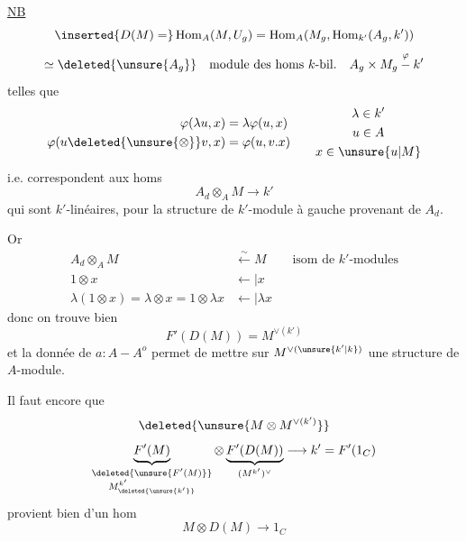\uline{NB}
\[
\inserted{D(M)=}
\operatorname{Hom}_A(M,U_g)
=\operatorname{Hom}_A(M_g,\operatorname{Hom}_{k'}(A_g,k'))
\]
\[
\simeq\deleted{\unsure{A_g}}\quad
\text{module des homs }k\text{-bil.}\quad
A_g\times M_g\overset{\varphi}{-}k'
\]
telles que
\[
\begin{aligned}
\varphi(\lambda u,x)&=\lambda\varphi(u,x)\\
\varphi(u\deleted{\unsure{\otimes}}v,x)&=\varphi(u,v.x)
\end{aligned}
\qquad
\begin{gathered}
\lambda\in k'\\u\in A\\x\in\unsure{u|M}
\end{gathered}
\]
i.e. correspondent aux homs
\[
A_d\otimes_A M\longrightarrow k'
\]
qui sont $k'$-linéaires, pour la structure de $k'$-module à gauche
provenant de $A_d$.

Or
\[
\begin{aligned}
A_d\otimes_A M&\xleftarrow{\sim}M
&&\text{isom de }k'\text{-modules}\\
1\otimes x&\mathrel{\longleftarrow\!\vert} x\\
\lambda(1\otimes x)=\lambda\otimes x=1\otimes\lambda x
&\mathrel{\longleftarrow\!\vert}\lambda x
\end{aligned}
\]
donc on trouve bien 
\[
F'(D(M))=M^{\vee(k')}
\]
et la donnée de $a:A-A^o$ permet de mettre sur
$M^{\vee(\unsure{k'|k})}$ une structure de $A$-module.

Il faut encore que
\[
\deleted{\unsure{M\otimes M^{\vee(k')}}}
\]
\[
\underbrace{F'(M)}_{\substack{\deleted{\unsure{F'(M)}}\\
M_{\deleted{\unsure{k'}}}^{k'}}}
\otimes
\underbrace{F'(D(M))}_{(M^{k'})^\vee}
\longrightarrow k'=F'(1_C)
\]
provient bien  d'un hom
\[
M\otimes D(M)\longrightarrow1_C
\]
